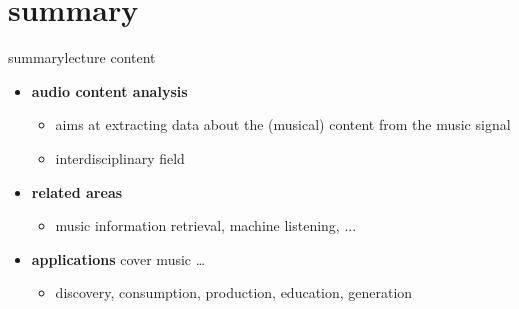     \section{summary}
        \begin{frame}{summary}{lecture content}
            \begin{itemize}
                \item   \textbf{audio content analysis} 
                    \begin{itemize}
                        \item   aims at extracting data about the (musical) content from the music signal
                        \item   interdisciplinary field
                    \end{itemize}
                \bigskip
                \item   \textbf{related areas} 
                    \begin{itemize}
                        \item   music information retrieval, machine listening, ...
                    \end{itemize}
                \bigskip
                \item   \textbf{applications}  cover music \ldots
                    \begin{itemize}
                        \item    discovery, consumption, production, education, generation
                    \end{itemize}
            \end{itemize}
        \end{frame}

